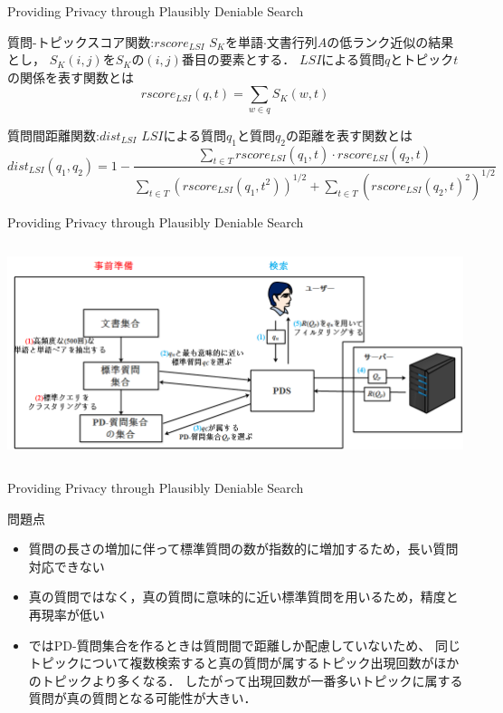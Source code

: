 \documentclass[14pt,xcolor=dvipsnames,table,dvipdfmx]{beamer}
\begin{document}
\begin{frame}{Providing Privacy through Plausibly Deniable Search \cite{providing2009}}
	\fontsize{12pt}{7.2}\selectfont
	\begin{block}{質問-トピックスコア関数:$rscore_{LSI}$}
		$S_K$を単語$\cdot$文書行列$A$の低ランク近似の結果とし，
		$S_K(i,j)$を$S_K$の$(i,j)$番目の要素とする．
		$LSI$による質問$q$とトピック$t$の関係を表す関数とは
		\begin{equation}
			rscore_{LSI}(q,t) = \sum_{w \in q}S_K(w,t)
		\end{equation}
	\end{block}
	\begin{block}{質問間距離関数:$dist_{LSI}$}
		$LSI$による質問$q_1$と質問$q_2$の距離を表す関数とは
		\begin{equation}
			dist_{LSI}(q_1,q_2) = 1-\frac{\sum_{t \in T}rscore_{LSI}(q_1,t) \cdot rscore_{LSI}(q_2,t)}{\sum_{t \in T}(rscore_{LSI}(q_1,t^2))^{1/2}+\sum_{t \in T}(rscore_{LSI}(q_2,t)^2)^{1/2}}
		\end{equation}
	\end{block}
\end{frame}

\begin{frame}{Providing Privacy through Plausibly Deniable Search \cite{providing2009}}
	\begin{columns}[t]
		\begin{column}{0.95\textwidth} %
			\includegraphics[width=\columnwidth]{th01.png}
		\end{column}
	\end{columns}
\end{frame}

\begin{frame}{Providing Privacy through Plausibly Deniable Search \cite{providing2009}}
	\begin{block}{問題点}
		\begin{itemize}
			\item 	質問の長さの増加に伴って標準質問の数が指数的に増加するため，長い質問対応できない
			\item 	真の質問ではなく，真の質問に意味的に近い標準質問を用いるため，精度と再現率が低い
			\item 	\cite{providing2009}ではPD-質問集合を作るときは質問間で距離しか配慮していないため、
					同じトピックについて複数検索すると真の質問が属するトピック出現回数がほかのトピックより多くなる．
					したがって出現回数が一番多いトピックに属する質問が真の質問となる可能性が大きい．
		\end{itemize}
	\end{block}
\end{frame}
\end{document}
